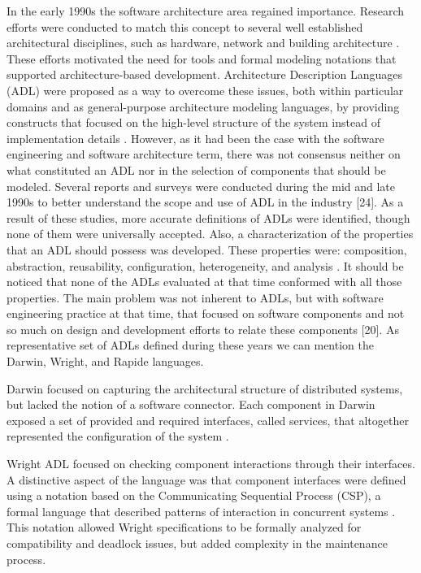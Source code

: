 \documentclass[10pt]{article}
\begin{document}
In the early 1990s the software architecture area regained importance. Research efforts were conducted to match this concept to several well established architectural disciplines, such as hardware, network and building architecture \cite{Perry92}. These efforts motivated the need for tools and formal modeling notations that supported architecture-based development. Architecture Description Languages (ADL) were proposed as a way to overcome these issues, both within particular domains and as general-purpose architecture modeling languages, by providing constructs that focused on the high-level structure of the system instead of implementation details \cite{Shaw96}. However, as it had been the case with the software engineering and software architecture term, there was not consensus neither on what constituted an ADL nor in the selection of components that should be modeled. Several reports and surveys were conducted during the mid and late 1990s to better understand the scope and use of ADL in the industry \cite{Shaw96}[24]. As a result of these studies, more accurate definitions of ADLs were identified, though none of them were universally accepted. Also, a characterization of the properties that an ADL should possess was developed. These properties were: composition, abstraction, reusability, configuration, heterogeneity, and analysis \cite{Shaw96}. It should be noticed that none of the ADLs evaluated at that time conformed with all those properties. The main problem was not inherent to ADLs, but with software engineering practice at that time, that focused on software components and not so much on design and development efforts to relate these components [20]. As representative set of ADLs defined during these years we can mention the Darwin, Wright, and Rapide languages.

Darwin focused on capturing the architectural structure of distributed systems, but lacked the notion of a software connector. Each component in Darwin exposed a set of provided and required interfaces, called services, that altogether represented the configuration of the system \cite{Dashofy07}.

Wright ADL focused on checking component interactions through their interfaces. A distinctive aspect of the language was that component interfaces were defined using a notation based on the Communicating Sequential Process (CSP), a formal language that described patterns of interaction in concurrent systems \cite{Dashofy07}. This notation allowed Wright specifications to be formally analyzed for compatibility and deadlock issues, but added complexity in the maintenance process.
\end{document}
